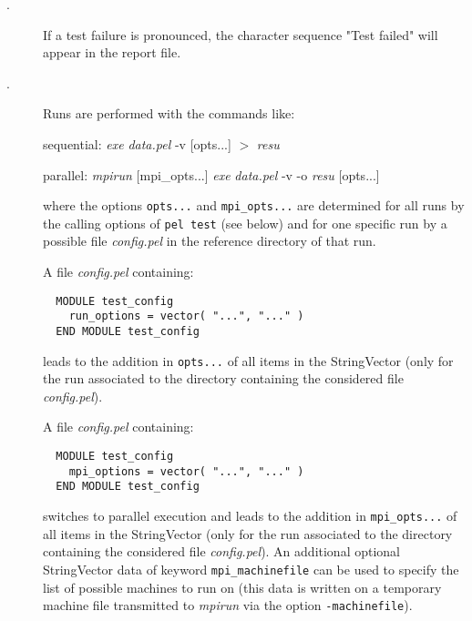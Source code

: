 \documentclass{article}
\begin{document}
\begin{description}

\item[.] \mbox{}

If a test failure is pronounced, the character sequence
"Test failed" will appear in the report file.


\item[.] \mbox{}

Runs are performed with the commands like:



sequential: \emph{exe} \emph{data.pel} -v [opts...] $>$ \emph{resu}



parallel:   \emph{mpirun} [mpi\_opts...] \emph{exe} \emph{data.pel} -v -o \emph{resu} [opts...]



where the options \texttt{opts...} and \texttt{mpi\_opts...} are determined
for all runs by the calling options of \texttt{pel test} (see below)
and for one specific run by a possible file \emph{config.pel} in
the reference directory of that run.



A file \emph{config.pel} containing:

\begin{verbatim}
  MODULE test_config
    run_options = vector( "...", "..." )
  END MODULE test_config
\end{verbatim}


leads to the addition in \texttt{opts...} of all items in the StringVector
(only for the run associated to the directory
containing the considered file \emph{config.pel}).



A file \emph{config.pel} containing:

\begin{verbatim}
  MODULE test_config
    mpi_options = vector( "...", "..." )
  END MODULE test_config
\end{verbatim}


switches to parallel execution and leads to the addition in \texttt{mpi\_opts...} of
all items in the StringVector (only for the run associated to the directory
containing the considered file \emph{config.pel}).
An additional optional StringVector data of keyword \texttt{mpi\_machinefile}
can be used to specify the list of possible machines to run on
(this data is written on a temporary machine file transmitted to \emph{mpirun}
via the option \texttt{-machinefile}).



\end{description}
\end{document}
